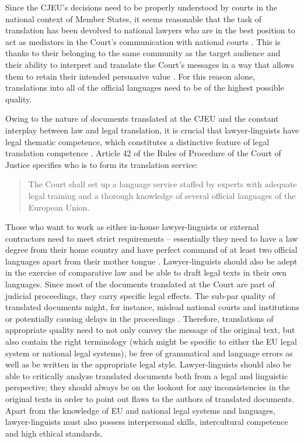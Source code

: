 \documentclass[output=paper]{langsci/langscibook}
\begin{document}
Since the CJEU’s decisions need to be properly understood by courts in the national context of Member States, it seems reasonable that the task of translation has been devolved to national lawyers who are in the best position to act as mediators in the Court’s communication with national courts \citep[85–86]{Łachacz2013}. This is thanks to their belonging to the same community as the target audience and their ability to interpret and translate the Court’s messages in a way that allows them to retain their intended persuasive value \citep{Łachacz2013}. For this reason alone, translations into all of the official languages need to be of the highest possible quality.

Owing to the nature of documents translated at the CJEU and the constant interplay between law and legal translation, it is crucial that lawyer-linguists have legal thematic competence, which constitutes a distinctive feature of legal translation competence \citep[11]{PrietoRamos2011}. Article 42 of the Rules of Procedure of the Court of Justice specifies who is to form its translation service:
\begin{quote}
The Court shall set up a language service staffed by experts with adequate legal training and a thorough knowledge of several official languages of the European Union.
\end{quote}

Those who want to work as either in-house lawyer-linguists or external contractors need to meet strict requirements – essentially they need to have a law degree from their home country and have perfect command of at least two official languages apart from their mother tongue \citealt[10]{McAuliffe2016}. Lawyer-linguists should also be adept in the exercise of comparative law and be able to draft legal texts in their own languages. Since most of the documents translated at the Court are part of judicial proceedings, they carry specific legal effects. The sub-par quality of translated documents might, for instance, mislead national courts and institutions or potentially causing delays in the proceedings \citep[9]{Izzo2014a}. Therefore, translations of appropriate quality need to not only convey the message of the original text, but also contain the right terminology (which might be specific to either the EU legal system or national legal systems), be free of grammatical and language errors as well as be written in the appropriate legal style. Lawyer-linguists should also be able to critically analyze translated documents both from a legal and linguistic perspective; they should always be on the lookout for any inconsistencies in the original texts in order to point out flaws to the authors of translated documents. Apart from the knowledge of EU and national legal systems and languages, lawyer-linguists must also possess interpersonal skills, intercultural competence and high ethical standards.
\end{document}
